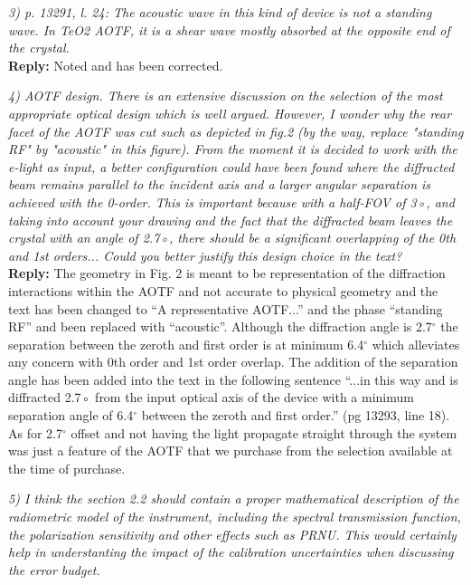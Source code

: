 \documentclass[12pt, notitlepage]{article}
\begin{document}
\hrulefill

\textit{3) p. 13291, l. 24: The acoustic wave in this kind of device is not a standing wave. In
TeO2 AOTF, it is a shear wave mostly absorbed at the opposite end of the crystal.}\\

\textbf{Reply:} Noted and has been corrected.

\hrulefill

\textit{4) AOTF design. There is an extensive discussion on the selection of the most appropriate
optical design which is well argued. However, I wonder why the rear facet of the
AOTF was cut such as depicted in fig.2 (by the way, replace "standing RF" by "acoustic"
in this figure). From the moment it is decided to work with the e-light as input, a
better configuration could have been found where the diffracted beam remains parallel
to the incident axis and a larger angular separation is achieved with the 0-order. This is
important because with a half-FOV of 3◦, and taking into account your drawing and the
fact that the diffracted beam leaves the crystal with an angle of 2.7◦, there should be a
significant overlapping of the 0th and 1st orders... Could you better justify this design
choice in the text?}\\

\textbf{Reply:} The geometry in Fig. 2 is meant to be representation of the diffraction interactions within the AOTF and not accurate to physical geometry and the text has been changed to ``A representative AOTF...'' and the phase ``standing RF'' and been replaced with ``acoustic''. Although the diffraction angle is 2.7$^{\circ}$ the separation between the zeroth and first order is at minimum 6.4$^{\circ}$ which alleviates any concern with 0th order and 1st order overlap. The addition of the separation angle has been added into the text in the following sentence ``...in this way and is diffracted 2.7◦ from the input optical axis of the device with a minimum separation angle of 6.4$^{\circ}$ between the zeroth and first order.'' (pg 13293, line 18). As for 2.7$^{\circ}$ offset and not having the light propagate straight through the system was just a feature of the AOTF that we purchase from the selection available at the time of purchase.

\hrulefill

\textit{5) I think the section 2.2 should contain a proper mathematical description of the radiometric
model of the instrument, including the spectral transmission function, the
polarization sensitivity and other effects such as PRNU. This would certainly help in
understanting the impact of the calibration uncertainties when discussing the error budget.}\\
\end{document}
